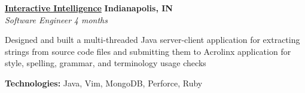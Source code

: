 %
    \headerrow
        {\textbf{\href{https://www.genesys.com/inin}{Interactive Intelligence}}}
        {\textbf{Indianapolis, IN}}
    \\
    \headerrow
        {\emph{Software Engineer}}
        {\emph{4 months}}
    \begin{itemize*}
         \item Designed and built a multi-threaded Java server-client application for extracting strings from
                source code files and submitting them to Acrolinx application for style, spelling, grammar, and terminology
                usage checks
    \end{itemize*}

    \hspace{1.0em}
    \textbf{Technologies:} Java, Vim, MongoDB, Perforce, Ruby

